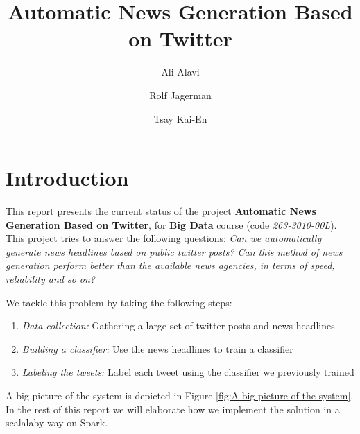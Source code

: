 \documentclass{llncs}
\begin{document}
%
\mainmatter              %
\pagestyle{headings}

%
\title{Automatic News Generation Based on Twitter}
%
%
\author{Ali Alavi \and Rolf Jagerman \and
Tsay Kai-En}
%
%
%

\maketitle              %
%

\section{Introduction}
This report presents the current status of the project \textbf{Automatic News Generation Based on Twitter}, for \textbf{Big Data} course (code \textit{263-3010-00L}). This project tries to answer the following questions: 
\textit{Can we automatically generate news headlines based on public twitter posts? Can this method of news generation perform better than the available news agencies, in terms of speed, reliability and so on?}

We tackle this problem by taking the following steps:

\begin{enumerate}
	\item \textit{Data collection: }Gathering a large set of twitter posts and news headlines 
	\item \textit{Building a classifier: }Use the news headlines to train a classifier
	\item \textit{Labeling the tweets: }Label each tweet using the classifier we previously trained
\end{enumerate}

A big picture of the system is depicted in Figure \ref{fig:A big picture of the system}. In the rest of this report we will elaborate how we implement the solution in a scalalaby way on Spark. 
\end{document}
